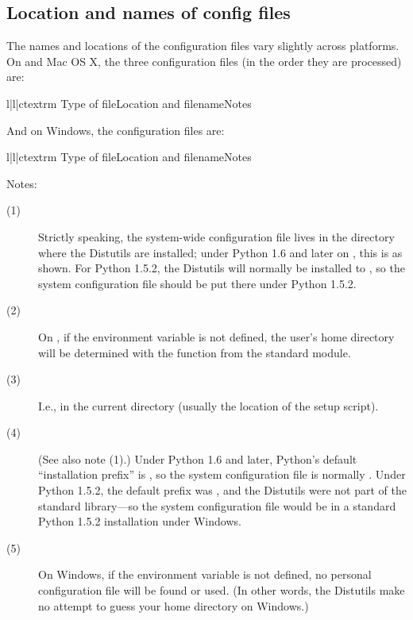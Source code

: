 \documentclass{howto}
\begin{document}
\subsection{Location and names of config files}
\label{config-filenames}

The names and locations of the configuration files vary slightly across
platforms.  On \UNIX{} and Mac OS X, the three configuration files (in
the order they are processed) are:
\begin{tableiii}{l|l|c}{textrm}
  {Type of file}{Location and filename}{Notes}
\end{tableiii}

And on Windows, the configuration files are:
\begin{tableiii}{l|l|c}{textrm}
  {Type of file}{Location and filename}{Notes}
\end{tableiii}

\noindent Notes:
\begin{description}
\item[(1)] Strictly speaking, the system-wide configuration file lives
  in the directory where the Distutils are installed; under Python 1.6
  and later on \UNIX, this is as shown. For Python 1.5.2, the Distutils
  will normally be installed to
  ,
  so the system configuration file should be put there under Python
  1.5.2.
\item[(2)] On \UNIX, if the  environment variable is not
  defined, the user's home directory will be determined with the
   function from the standard
   module.
\item[(3)] I.e., in the current directory (usually the location of the
  setup script).
\item[(4)] (See also note (1).)  Under Python 1.6 and later, Python's
  default ``installation prefix'' is , so
  the system configuration file is normally
  .
  Under Python 1.5.2, the default prefix was
  , and the
  Distutils were not part of the standard library---so the system
  configuration file would be
  in a standard Python 1.5.2 installation under Windows.
\item[(5)] On Windows, if the  environment variable is not
  defined, no personal configuration file will be found or used.  (In
  other words, the Distutils make no attempt to guess your home
  directory on Windows.)
\end{description}
\end{document}
